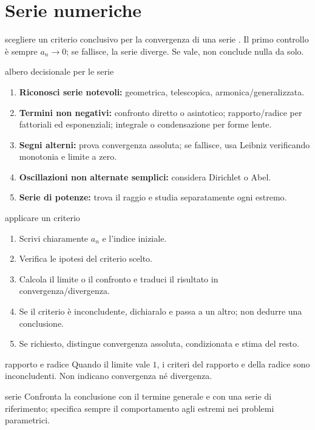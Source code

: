 \chapter{Serie numeriche}
\label{chap:17}

\begin{obiettivocapitolo}{scegliere un criterio conclusivo per la convergenza di una serie}
\prioritaalta. Il primo controllo è sempre $a_n\to0$; se fallisce, la serie diverge. Se vale, non conclude nulla da solo.
\end{obiettivocapitolo}
\begin{sceltametodo}{albero decisionale per le serie}
\begin{enumerate}
\item \textbf{Riconosci serie notevoli:} geometrica, telescopica, armonica/generalizzata.
\item \textbf{Termini non negativi:} confronto diretto o asintotico; rapporto/radice per fattoriali ed esponenziali; integrale o condensazione per forme lente.
\item \textbf{Segni alterni:} prova convergenza assoluta; se fallisce, usa Leibniz verificando monotonia e limite a zero.
\item \textbf{Oscillazioni non alternate semplici:} considera Dirichlet o Abel.
\item \textbf{Serie di potenze:} trova il raggio e studia separatamente ogni estremo.
\end{enumerate}
\end{sceltametodo}
\begin{proceduraesame}{applicare un criterio}
\begin{enumerate}
\item Scrivi chiaramente $a_n$ e l'indice iniziale.
\item Verifica le ipotesi del criterio scelto.
\item Calcola il limite o il confronto e traduci il risultato in convergenza/divergenza.
\item Se il criterio è inconcludente, dichiaralo e passa a un altro; non dedurre una conclusione.
\item Se richiesto, distingue convergenza assoluta, condizionata e stima del resto.
\end{enumerate}
\end{proceduraesame}
\begin{errorefrequente}{rapporto e radice}
Quando il limite vale $1$, i criteri del rapporto e della radice sono inconcludenti. Non indicano convergenza né divergenza.
\end{errorefrequente}
\begin{controllofinale}{serie}
Confronta la conclusione con il termine generale e con una serie di riferimento; specifica sempre il comportamento agli estremi nei problemi parametrici.
\end{controllofinale}

